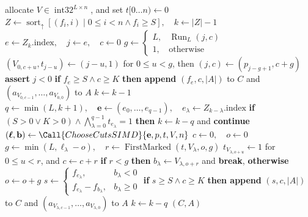 \begin{algorithm}[H]
\begin{algorithmic}[1]
    \State allocate \(V\in\operatorname{int32}^{L\times n}\), and set
      \(t[0\ldots n)\gets0\)
    \State \(Z\gets\operatorname{sort}_{\uparrow}
      [(f_i,i)\mid0\leq i<n\land f_i\geq S],\quad k\gets|Z|-1\)
      \State \(e\gets Z_k.\mathrm{index},\quad j\gets e,\quad c\gets0\)
        \State \(g\gets
          \begin{cases}L,&\operatorname{Run}_L(j,c)\\
          1,&\text{otherwise}\end{cases}\)
        \State \((V_{0,c+u},t_{j-u})\gets(j-u,1)\) for \(0\leq u<g\),
          then \((j,c)\gets(p_{j-g+1},c+g)\)
      \EndWhile
      \State \textbf{assert } \(j < 0\)
      \State \textbf{if } \(f_e\geq S\land c\geq K\) \textbf{ then append }
        \((f_e,c,|A|)\) to \(C\) and
        \((a_{V_{0,c-1}},\ldots,a_{V_{0,0}})\) to \(A\)
      \State \(k\gets k-1\)
    \EndIf
      \State \(q\gets\min(L,k+1),\quad
        \mathbf e\gets(e_0,\ldots,e_{q-1}),\quad
        e_\lambda\gets Z_{k-\lambda}.\mathrm{index}\)
      \State \textbf{if } \((S>0\lor K>0)\land
        \bigwedge_{\lambda=0}^{q-1}t_{e_\lambda}=1\) \textbf{ then }
        \(k\gets k-q\) and \textbf{continue}
      \State \((\boldsymbol\ell,\mathbf b)\gets
        \Call{ChooseCutsSIMD}{\mathbf e,p,t,V,n}\)
        \State \(c\gets0,\quad o\gets0\) 
          \State \(g\gets\min(L,\ell_\lambda-o),\quad
            r\gets\operatorname{FirstMarked}(t,V_\lambda,o,g)\)
          \State \(t_{V_{\lambda,o+u}}\gets1\) for \(0\leq u<r\), and
            \(c\gets c+r\)
          \State \textbf{if } \(r<g\) \textbf{ then }
            \(b_\lambda\gets V_{\lambda,o+r}\) and \textbf{break},
            \textbf{ otherwise } \(o\gets o+g\)
        \EndWhile
        \State \(s\gets
          \begin{cases}f_{e_\lambda},&b_\lambda<0\\
          f_{e_\lambda}-f_{b_\lambda},&b_\lambda\geq0\end{cases}\)
        \State \textbf{if } \(s\geq S\land c\geq K\) \textbf{ then append }
          \((s,c,|A|)\) to \(C\) and
          \((a_{V_{\lambda,c-1}},\ldots,a_{V_{\lambda,0}})\) to \(A\)
      \EndFor
      \State \(k\gets k-q\)
    \EndWhile
    \State \Return \((C,A)\)
  \EndFunction
\end{algorithmic}
\end{algorithm}

